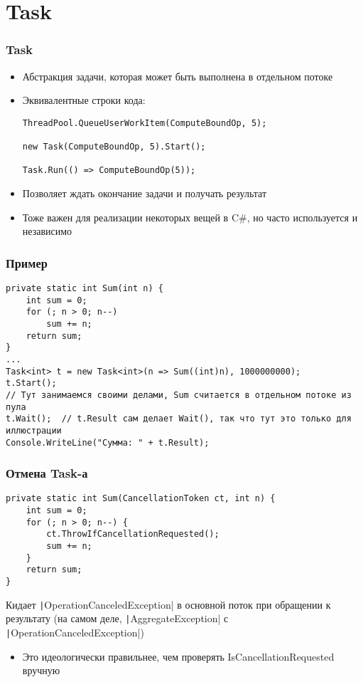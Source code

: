\documentclass{../../slides-style}
\begin{document}
    \section{Task}

    \begin{frame}[fragile]
        \frametitle{Task}
        \begin{itemize}
            \item Абстракция задачи, которая может быть выполнена в отдельном потоке
            \item Эквивалентные строки кода:
                \begin{verbatim}
ThreadPool.QueueUserWorkItem(ComputeBoundOp, 5);

new Task(ComputeBoundOp, 5).Start();

Task.Run(() => ComputeBoundOp(5));
                \end{verbatim}
            \item Позволяет ждать окончание задачи и получать результат
            \item Тоже важен для реализации некоторых вещей в C\#, но часто используется и независимо
        \end{itemize}
    \end{frame}

    \begin{frame}[fragile]
        \frametitle{Пример}
        \begin{footnotesize}
            \begin{verbatim}
private static int Sum(int n) {
    int sum = 0;
    for (; n > 0; n--)
        sum += n;
    return sum;
}
...
Task<int> t = new Task<int>(n => Sum((int)n), 1000000000);
t.Start();
// Тут занимаемся своими делами, Sum считается в отдельном потоке из пула
t.Wait();  // t.Result сам делает Wait(), так что тут это только для иллюстрации
Console.WriteLine("Сумма: " + t.Result);
            \end{verbatim}
        \end{footnotesize}
    \end{frame}

    \begin{frame}[fragile]
        \frametitle{Отмена Task-а}
        \begin{verbatim}
private static int Sum(CancellationToken ct, int n) {
    int sum = 0;
    for (; n > 0; n--) {
        ct.ThrowIfCancellationRequested();
        sum += n;
    }
    return sum;
}
        \end{verbatim}
        \vspace{3mm}
        Кидает \texttt|OperationCanceledException| в основной поток при обращении к результату (на самом деле, \texttt|AggregateException| с \texttt|OperationCanceledException|)
        \begin{itemize}
            \item Это идеологически правильнее, чем проверять IsCancellationRequested вручную
        \end{itemize}
    \end{frame}
\end{document}
